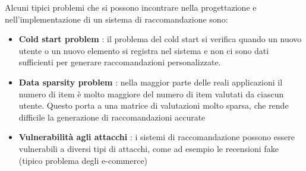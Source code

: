\noindent Alcuni tipici problemi che si possono incontrare nella progettazione e nell'implementazione di un sistema di raccomandazione sono:
\begin{itemize}
    \item \textbf{Cold start problem} \cite{ColdStart}: il problema del cold start si verifica quando un nuovo utente o un nuovo elemento si registra nel sistema e non ci sono dati sufficienti per generare raccomandazioni personalizzate.
    \item \textbf{Data sparsity problem} \cite{DataSparsity}: nella maggior parte delle reali applicazioni il numero di item è molto maggiore del numero di item valutati da ciascun utente. Questo porta a una matrice di valutazioni molto sparsa, che rende difficile la generazione di raccomandazioni accurate
    \item \textbf{Vulnerabilità agli attacchi} \cite{Attacchi} : i sistemi di raccomandazione possono essere vulnerabili a diversi tipi di attacchi, come ad esempio le recensioni fake (tipico problema degli e-commerce)
\end{itemize}


